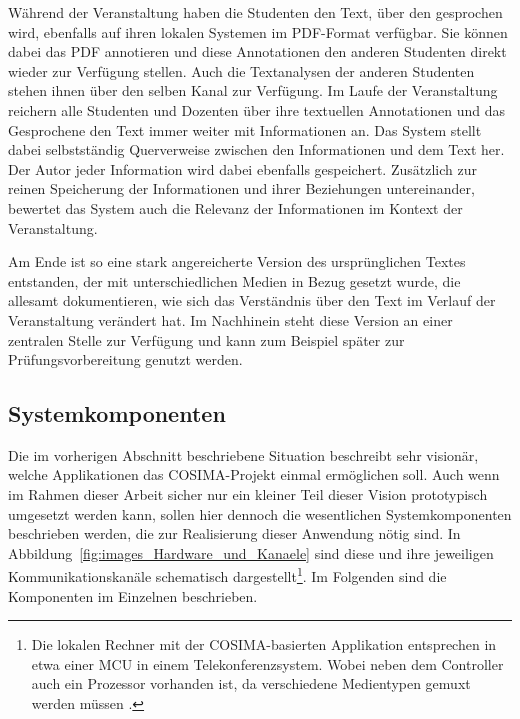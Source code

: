 \begin{kasten}
      Während der Veranstaltung haben die Studenten den Text, über den gesprochen wird, ebenfalls auf ihren lokalen Systemen im PDF-Format verfügbar. Sie können dabei das PDF annotieren und diese Annotationen den anderen Studenten direkt wieder zur Verfügung stellen. Auch die Textanalysen der anderen Studenten stehen ihnen über den selben Kanal zur Verfügung. Im Laufe der Veranstaltung reichern alle Studenten und Dozenten über ihre textuellen Annotationen und das Gesprochene den Text immer weiter mit Informationen an. Das System stellt dabei selbstständig Querverweise zwischen den Informationen und dem Text her. Der Autor jeder Information wird dabei ebenfalls gespeichert. Zusätzlich zur reinen Speicherung der Informationen und ihrer Beziehungen untereinander, bewertet das System auch die Relevanz der Informationen im Kontext der Veranstaltung.

      Am Ende ist so eine stark angereicherte Version des ursprünglichen Textes entstanden, der mit unterschiedlichen Medien in Bezug gesetzt wurde, die allesamt dokumentieren, wie sich das Verständnis über den Text im Verlauf der Veranstaltung verändert hat. Im Nachhinein steht diese Version an einer zentralen Stelle zur Verfügung und kann zum Beispiel später zur Prüfungsvorbereitung genutzt werden.


  \end{kasten}


\subsection{Systemkomponenten} %
\label{sub:systemkomponenten}

  Die im vorherigen Abschnitt beschriebene Situation beschreibt sehr visionär, welche Applikationen das COSIMA-Projekt einmal ermöglichen soll. Auch wenn im Rahmen dieser Arbeit sicher nur ein kleiner Teil dieser Vision prototypisch umgesetzt werden kann, sollen hier dennoch die wesentlichen Systemkomponenten beschrieben werden, die zur Realisierung dieser Anwendung nötig sind. In Abbildung~\ref{fig:images_Hardware_und_Kanaele} sind diese und ihre jeweiligen Kommunikationskanäle schematisch dargestellt\footnote{Die lokalen Rechner mit der COSIMA-basierten Applikation entsprechen in etwa einer MCU in einem Telekonferenzsystem. Wobei neben dem Controller auch ein Prozessor vorhanden ist, da verschiedene Medientypen gemuxt werden müssen \citep[S. 224]{schwabe2001ckl}.}. Im Folgenden sind die Komponenten im Einzelnen beschrieben.

